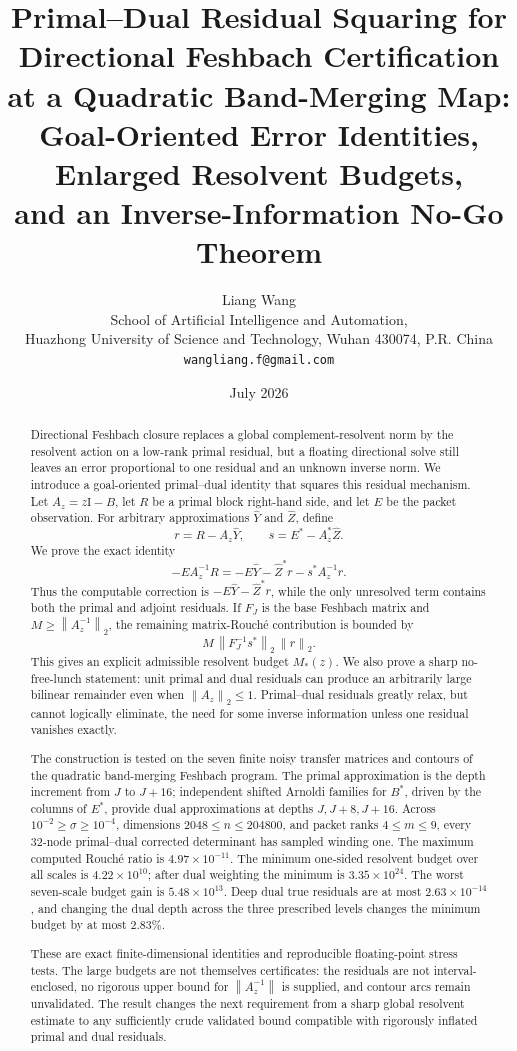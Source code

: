 \documentclass[11pt]{article}
\title{\textbf{Primal--Dual Residual Squaring for Directional Feshbach Certification}\\
\textbf{at a Quadratic Band-Merging Map:}\\[0.35em]
\large Goal-Oriented Error Identities, Enlarged Resolvent Budgets,\\
and an Inverse-Information No-Go Theorem}
\author{Liang Wang\\
\small School of Artificial Intelligence and Automation,\\[-0.2em]
\small Huazhong University of Science and Technology, Wuhan 430074, P.R. China\\
\small \texttt{wangliang.f@gmail.com}}
\date{July 2026}
\theoremstyle{definition}
\theoremstyle{remark}
\newcommand{\Id}{\mathrm I}
\newcommand{\norm}[1]{\left\lVert#1\right\rVert}
\begin{document}
\maketitle

\begin{abstract}
Directional Feshbach closure replaces a global complement-resolvent norm by
the resolvent action on a low-rank primal residual, but a floating
directional solve still leaves an error proportional to one residual and an
unknown inverse norm.  We introduce a goal-oriented primal--dual identity
that squares this residual mechanism.  Let
\(A_z=z\Id-B\), let \(R\) be a primal block right-hand side, and let
\(E\) be the packet observation.  For arbitrary approximations
\(\widehat Y\) and \(\widehat Z\), define
\[
 r=R-A_z\widehat Y,
 \qquad s=E^*-A_z^*\widehat Z.
\]
We prove the exact identity
\[
 -EA_z^{-1}R
 =-E\widehat Y-\widehat Z^*r-s^*A_z^{-1}r.
\]
Thus the computable correction is \(-E\widehat Y-\widehat Z^*r\), while
the only unresolved term contains both the primal and adjoint residuals.  If
\(F_J\) is the base Feshbach matrix and
\(M\geq\norm{A_z^{-1}}_2\), the remaining matrix-Rouch\'e contribution is
bounded by
\[
 M\,\norm{F_J^{-1}s^*}_2\,\norm{r}_2.
\]
This gives an explicit admissible resolvent budget \(M_*(z)\).  We also
prove a sharp no-free-lunch statement: unit primal and dual residuals can
produce an arbitrarily large bilinear remainder even when
\(\norm{A_z}_2\leq1\).  Primal--dual residuals greatly relax, but cannot
logically eliminate, the need for some inverse information unless one
residual vanishes exactly.

The construction is tested on the seven finite noisy transfer matrices and
contours of the quadratic band-merging Feshbach program.  The primal
approximation is the depth increment from \(J\) to \(J+16\); independent
shifted Arnoldi families for \(B^*\), driven by the columns of \(E^*\),
provide dual approximations at depths \(J,J+8,J+16\).  Across
\(10^{-2}\geq\sigma\geq10^{-4}\), dimensions
\(2048\leq n\leq204800\), and packet ranks \(4\leq m\leq9\), every
32-node primal--dual corrected determinant has sampled winding one.  The
maximum computed Rouch\'e ratio is \(4.97\times10^{-11}\).  The minimum
one-sided resolvent budget over all scales is \(4.22\times10^{10}\); after
dual weighting the minimum is \(3.35\times10^{24}\).  The worst
seven-scale budget gain is \(5.48\times10^{13}\).  Deep dual true residuals
are at most \(2.63\times10^{-14}\), and changing the dual depth across the
three prescribed levels changes the minimum budget by at most \(2.83\%\).

These are exact finite-dimensional identities and reproducible
floating-point stress tests.  The large budgets are not themselves
certificates: the residuals are not interval-enclosed, no rigorous upper
bound for \(\norm{A_z^{-1}}\) is supplied, and contour arcs remain
unvalidated.  The result changes the next requirement from a sharp global
resolvent estimate to any sufficiently crude validated bound compatible
with rigorously inflated primal and dual residuals.
\end{abstract}
\end{document}
